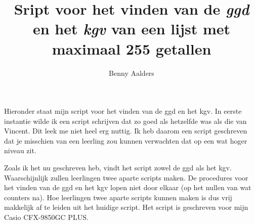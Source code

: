 \documentclass[a4paper]{article}
\author{Benny Aalders}
\title{Sript voor het vinden van de \emph{ggd} en het \emph{kgv} van een lijst met maximaal 255 getallen}
\date{}
\begin{document}
\maketitle

\noindent Hieronder staat mijn script voor het vinden van de ggd en het kgv. In eerste instantie wilde ik een script schrijven dat zo goed als hetzelfde was als die van Vincent. Dit leek me niet heel erg nuttig. Ik heb daarom een script geschreven dat je misschien van een leerling zou kunnen verwachten dat op een wat hoger niveau zit.

 Zoals ik het nu geschreven heb, vindt het script zowel de ggd als het kgv. Waarschijnlijk zullen leerlingen twee aparte scripts maken. De procedures voor het vinden van de ggd en het kgv lopen niet door elkaar (op het nullen van wat counters na). Hoe leerlingen twee aparte scripts kunnen maken is dus vrij makkelijk af te leiden uit het huidige script. Het script is geschreven voor mijn Casio CFX-9850GC PLUS. 


\end{document}
